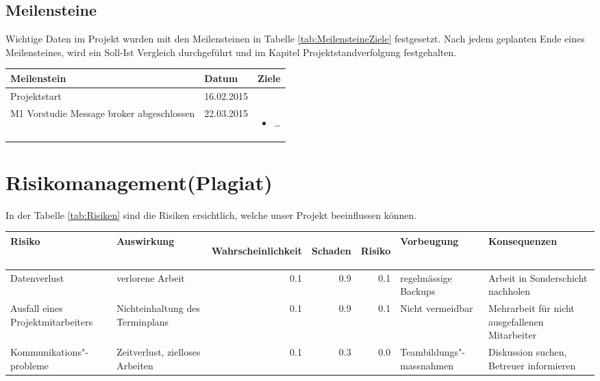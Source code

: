 \subsection{Meilensteine}

Wichtige Daten im Projekt wurden mit den Meilensteinen in Tabelle
\ref{tab:MeilensteineZiele} festgesetzt. Nach jedem geplanten Ende eines
Meilensteines, wird ein Soll-Ist Vergleich durchgeführt und im Kapitel
Projektstandverfolgung festgehalten.

\begin{tabular}[t]{|l|l|p{8cm}|}\hline
\textbf{Meilenstein} & \textbf{Datum} & \textbf{Ziele} \\ \hline \hline
Projektstart & 16.02.2015 & \\ \hline
M1 Vorstudie Message broker abgeschlossen & 22.03.2015 &
  \begin{itemize}
    \item \ldots
  \end{itemize} \\ \hline
\end{tabular}
\label{tab:MeilensteineZiele}


\newpage
\section{Risikomanagement(Plagiat)}

In der Tabelle \ref{tab:Risiken} sind die Risiken ersichtlich, welche
unser Projekt beeinflussen können.

\begin{tabular}[t]{|p{3cm}|p{3cm}|r|r|r|p{3cm}|p{3cm}|}\hline
\textbf{Risiko} &
  \textbf{Auswirkung} &
  \begin{sideways} \textbf{Wahrscheinlichkeit } \end{sideways} &
  \begin{sideways}\textbf{Schaden} \end{sideways} &
  \begin{sideways}\textbf{Risiko} \end{sideways} &
  \textbf{Vorbeugung} & \textbf{Konsequenzen} \\ \hline \hline
Datenverlust &
  verlorene Arbeit &
  0.1 & 0.9 & 0.1 &
  regelmässige Backups &
  Arbeit in Sonderschicht nachholen \\ \hline
Ausfall eines Projektmitarbeiters &
  Nichteinhaltung des Terminplans &
  0.1 & 0.9 & 0.1 &
  Nicht vermeidbar &
  Mehrarbeit für nicht ausgefallenen Mitarbeiter \\ \hline
Kommunikations"-probleme &
  Zeitverlust, zielloses Arbeiten &
  0.1 & 0.3 & 0.0 &
  Teambildungs"-massnahmen &
  Diskussion suchen, Betreuer informieren \\ \hline
\end{tabular}
\label{tab:Risiken}

